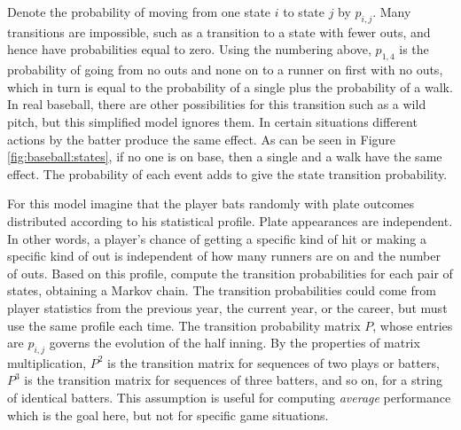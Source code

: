 \documentclass[12pt]{article}
\begin{document}
Denote the probability of moving from one state \( i \) to state \( j \)
by \( p_{i,j} \).  Many transitions are impossible, such as a transition
to a state with fewer outs, and hence have probabilities equal to zero.
Using the numbering above, \( p_{1,4} \) is the probability of going
from no outs and none on to a runner on first with no outs, which in
turn is equal to the probability of a single plus the probability of a
walk.  In real baseball, there are other possibilities for this
transition such as a wild pitch, but this simplified model ignores them.
In certain situations different actions by the batter produce the same
effect.  As can be seen in Figure~%
\ref{fig:baseball:states}, if no one is on base, then a single and a
walk have the same effect.  The probability of each event adds to give
the state transition probability.

For this model imagine that the player bats randomly with plate outcomes
distributed according to his statistical profile.  Plate appearances are
independent.  In other words, a player's chance of getting a specific
kind of hit or making a specific kind of out is independent of how many
runners are on and the number of outs.  Based on this profile, compute
the transition probabilities for each pair of states, obtaining a Markov
chain.  The transition probabilities could come from player statistics
from the previous year, the current year, or the career, but must use
the same profile each time.  The transition probability matrix \( P \),
whose entries are \( p_{i,j} \) governs the evolution of the half
inning.  By the properties of matrix multiplication, \( P^2 \) is the
transition matrix for sequences of two plays or batters, \( P^3 \) is
the transition matrix for sequences of three batters, and so on, for a
string of identical batters.  This assumption is useful for computing
\emph{average} performance which is the goal here, but not for specific
game situations.
\end{document}

